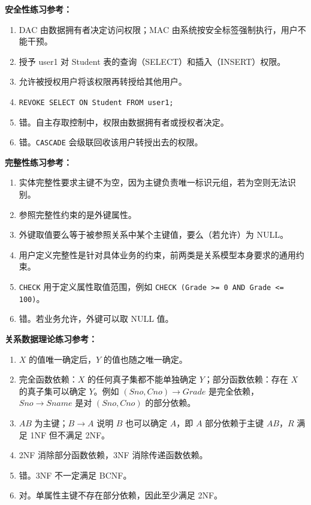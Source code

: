 \documentclass{../../note}
\begin{document}
\textbf{安全性练习参考：}

\begin{enumerate}
  \item DAC 由数据拥有者决定访问权限；MAC 由系统按安全标签强制执行，用户不能干预。
  \item 授予 user1 对 Student 表的查询（SELECT）和插入（INSERT）权限。
  \item 允许被授权用户将该权限再转授给其他用户。
  \item \texttt{REVOKE SELECT ON Student FROM user1;}
  \item 错。自主存取控制中，权限由数据拥有者或授权者决定。
  \item 错。\texttt{CASCADE} 会级联回收该用户转授出去的权限。
\end{enumerate}

\textbf{完整性练习参考：}

\begin{enumerate}
  \item 实体完整性要求主键不为空，因为主键负责唯一标识元组，若为空则无法识别。
  \item 参照完整性约束的是外键属性。
  \item 外键取值要么等于被参照关系中某个主键值，要么（若允许）为 NULL。
  \item 用户定义完整性是针对具体业务的约束，前两类是关系模型本身要求的通用约束。
  \item \texttt{CHECK} 用于定义属性取值范围，例如 \texttt{CHECK (Grade >= 0 AND Grade <= 100)}。
  \item 错。若业务允许，外键可以取 NULL 值。
\end{enumerate}

\textbf{关系数据理论练习参考：}

\begin{enumerate}
  \item $X$ 的值唯一确定后，$Y$ 的值也随之唯一确定。
  \item 完全函数依赖：$X$ 的任何真子集都不能单独确定 $Y$；部分函数依赖：存在 $X$ 的真子集可以确定 $Y$。例如 $(Sno, Cno) \to Grade$ 是完全依赖，$Sno \to Sname$ 是对 $(Sno, Cno)$ 的部分依赖。
  \item $AB$ 为主键；$B \to A$ 说明 $B$ 也可以确定 $A$，即 $A$ 部分依赖于主键 $AB$，$R$ 满足 1NF 但不满足 2NF。
  \item 2NF 消除部分函数依赖，3NF 消除传递函数依赖。
  \item 错。3NF 不一定满足 BCNF。
  \item 对。单属性主键不存在部分依赖，因此至少满足 2NF。
\end{enumerate}
\end{document}
